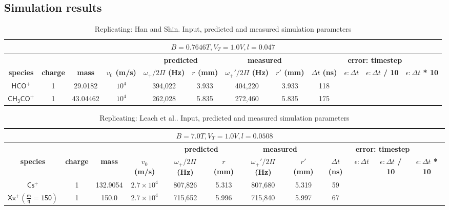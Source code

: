 \documentclass[10pt,conference,onecolumn]{IEEEtran}
\begin{document}
\subsection{Simulation results}

\begin{table}[htbp]
 \centering	  	  
 \caption{Replicating: Han and Shin\cite{Han1997}. Input, predicted and measured simulation parameters}
\label{tab:han}
\begin{tabular}{c|c|c|c|c|c|c|c|c|c|c|c}
 \hline \hline
  \multicolumn{12}{|c|}{$B = 0.7646 T, V_T = 1.0 V, l = 0.047$} \\
 \hline \hline
 \multicolumn{4}{|c|}{ } & \multicolumn{2}{|c|}{\textbf{predicted}} & \multicolumn{2}{|c|}{\textbf{measured}} & \multicolumn{4}{|c|}{\textbf{error: timestep}} \\ 
 \hline
 \textbf{species} & \textbf{charge} & \textbf{mass} & \textbf{$v_0$ (m/s)} & \textbf{$\omega_+ / 2\Pi$ (Hz)} & \textbf{$r$ (mm)} & \textbf{$\omega_+' / 2\Pi$ (Hz)}  & \textbf{$r'$ (mm)} & \textbf{$\Delta t$ (ns)} & \textbf{$\epsilon: \Delta t$}& \textbf{$\epsilon: \Delta t$ / 10} & \textbf{$\epsilon: \Delta t$ * 10}\\ 
 \hline
 $\mathsf{HCO^+}$ & 1 & 29.0182 & $10^4$ & 394,022 & 3.933 & 404,220 & 3.933 & 118 & \\
 $\mathsf{CH_3CO^+}$ & 1 & 43.04462 & $10^4$ & 262,028 & 5.835 & 272,460 & 5.835 & 175 & \\
 \hline \hline
\end{tabular}
\end{table}

\begin{table}[htbp]
 \centering	  	  
 \caption{Replicating: Leach et al.\cite{Leach2009}. Input, predicted and measured simulation parameters}
\label{tab:leach}
\begin{tabular}{c|c|c|c|c|c|c|c|c|c|c|c}
 \hline \hline
  \multicolumn{12}{|c|}{$B = 7.0 T, V_T = 1.0 V, l = 0.0508$} \\
 \hline \hline
 \multicolumn{4}{|c|}{ } & \multicolumn{2}{|c|}{\textbf{predicted}} & \multicolumn{2}{|c|}{\textbf{measured}} & \multicolumn{4}{|c|}{\textbf{error: timestep}} \\ 
 \hline
 \textbf{species} & \textbf{charge} & \textbf{mass} & \textbf{$v_0$ (m/s)} & \textbf{$\omega_+ / 2\Pi$ (Hz)} & \textbf{$r$ (mm)} & \textbf{$\omega_+' / 2\Pi$ (Hz)}  & \textbf{$r'$ (mm)} & \textbf{$\Delta t$ (ns)} & \textbf{$\epsilon: \Delta t$}& \textbf{$\epsilon: \Delta t$ / 10} & \textbf{$\epsilon: \Delta t$ * 10}\\ 
 \hline
 $\mathsf{Cs^+}$                   & 1 & 132.9054 & $2.7 \times 10^4$ & 807,826 & 5.313 & 807,680 & 5.319 & 59 & \\
 $\mathsf{Xx^+ (\frac{m}{q} = 150 )}$ & 1 & 150.0 & $2.7 \times 10^4$ & 715,652 & 5.996 & 715,840 & 5.997 & 67 & \\
 \hline \hline
\end{tabular}
\end{table}
\end{document}
